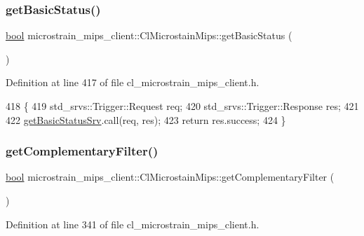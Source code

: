 \subsubsection{\texorpdfstring{get\+Basic\+Status()}{getBasicStatus()}}
{\footnotesize\ttfamily \hyperlink{classbool}{bool} microstrain\+\_\+mips\+\_\+client\+::\+Cl\+Microstain\+Mips\+::get\+Basic\+Status (\begin{DoxyParamCaption}{ }\end{DoxyParamCaption})\hspace{0.3cm}{\ttfamily [inline]}}



Definition at line 417 of file cl\+\_\+microstrain\+\_\+mips\+\_\+client.\+h.


\begin{DoxyCode}
418     \{
419         std\_srvs::Trigger::Request req;
420         std\_srvs::Trigger::Response res;
421 
422         \hyperlink{classmicrostrain__mips__client_1_1ClMicrostainMips_a9d9417b8082c318709d5644895a4f539}{getBasicStatusSrv}.call(req, res);
423         \textcolor{keywordflow}{return} res.success;
424     \}
\end{DoxyCode}
\mbox{\label{classmicrostrain__mips__client_1_1ClMicrostainMips_afe0f9a7fe9301e0932a7d8786c905ffb}} 
\subsubsection{\texorpdfstring{get\+Complementary\+Filter()}{getComplementaryFilter()}}
{\footnotesize\ttfamily \hyperlink{classbool}{bool} microstrain\+\_\+mips\+\_\+client\+::\+Cl\+Microstain\+Mips\+::get\+Complementary\+Filter (\begin{DoxyParamCaption}{ }\end{DoxyParamCaption})\hspace{0.3cm}{\ttfamily [inline]}}



Definition at line 341 of file cl\+\_\+microstrain\+\_\+mips\+\_\+client.\+h.



